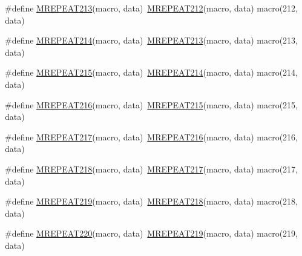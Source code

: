 \begin{DoxyCompactItemize}
\item 
\#define \mbox{\hyperlink{group__group__sam0__utils__mrepeat_gaccb21a4853dfcaf0709211bfb7bd8671}{M\+R\+E\+P\+E\+A\+T213}}(macro,  data)~\mbox{\hyperlink{group__group__sam0__utils__mrepeat_gad82f46aaf9a5b824c91394754824d66d}{M\+R\+E\+P\+E\+A\+T212}}(macro, data)   macro(212, data)
\item 
\#define \mbox{\hyperlink{group__group__sam0__utils__mrepeat_ga7dc8e4f802d149970b11ab09ee582aca}{M\+R\+E\+P\+E\+A\+T214}}(macro,  data)~\mbox{\hyperlink{group__group__sam0__utils__mrepeat_gaccb21a4853dfcaf0709211bfb7bd8671}{M\+R\+E\+P\+E\+A\+T213}}(macro, data)   macro(213, data)
\item 
\#define \mbox{\hyperlink{group__group__sam0__utils__mrepeat_gae2a73793b6f0682b5b209181a2cce5c3}{M\+R\+E\+P\+E\+A\+T215}}(macro,  data)~\mbox{\hyperlink{group__group__sam0__utils__mrepeat_ga7dc8e4f802d149970b11ab09ee582aca}{M\+R\+E\+P\+E\+A\+T214}}(macro, data)   macro(214, data)
\item 
\#define \mbox{\hyperlink{group__group__sam0__utils__mrepeat_gab9f89f1489a59ce0b2fdaf9c5a1eb04b}{M\+R\+E\+P\+E\+A\+T216}}(macro,  data)~\mbox{\hyperlink{group__group__sam0__utils__mrepeat_gae2a73793b6f0682b5b209181a2cce5c3}{M\+R\+E\+P\+E\+A\+T215}}(macro, data)   macro(215, data)
\item 
\#define \mbox{\hyperlink{group__group__sam0__utils__mrepeat_gac3e3763cfaa790bd77c54a125a5342ba}{M\+R\+E\+P\+E\+A\+T217}}(macro,  data)~\mbox{\hyperlink{group__group__sam0__utils__mrepeat_gab9f89f1489a59ce0b2fdaf9c5a1eb04b}{M\+R\+E\+P\+E\+A\+T216}}(macro, data)   macro(216, data)
\item 
\#define \mbox{\hyperlink{group__group__sam0__utils__mrepeat_ga35dba4e312bc00bcfcbf099981b01206}{M\+R\+E\+P\+E\+A\+T218}}(macro,  data)~\mbox{\hyperlink{group__group__sam0__utils__mrepeat_gac3e3763cfaa790bd77c54a125a5342ba}{M\+R\+E\+P\+E\+A\+T217}}(macro, data)   macro(217, data)
\item 
\#define \mbox{\hyperlink{group__group__sam0__utils__mrepeat_gad3ad7ca1333f24fd50e250e28d312509}{M\+R\+E\+P\+E\+A\+T219}}(macro,  data)~\mbox{\hyperlink{group__group__sam0__utils__mrepeat_ga35dba4e312bc00bcfcbf099981b01206}{M\+R\+E\+P\+E\+A\+T218}}(macro, data)   macro(218, data)
\item 
\#define \mbox{\hyperlink{group__group__sam0__utils__mrepeat_ga87b159389edf9a6b6f2e0fcf17139964}{M\+R\+E\+P\+E\+A\+T220}}(macro,  data)~\mbox{\hyperlink{group__group__sam0__utils__mrepeat_gad3ad7ca1333f24fd50e250e28d312509}{M\+R\+E\+P\+E\+A\+T219}}(macro, data)   macro(219, data)

\end{DoxyCompactItemize}
